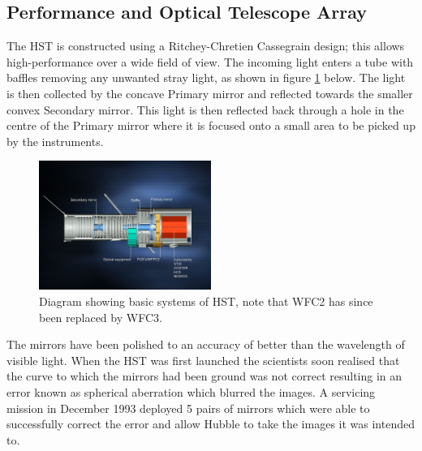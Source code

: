 	\subsection{Performance and Optical Telescope Array} %
		\label{ssub:performance_and_optical_telescope_array}
		The HST is constructed using a Ritchey-Chretien Cassegrain design; this allows high-performance over a wide field of view. The incoming light enters a tube with baffles removing any unwanted stray light, as shown in figure \ref{fig:HST_optical_diagram} below. The light is then collected by the concave Primary mirror and reflected towards the smaller convex Secondary mirror. This light is then reflected back through a hole in the centre of the Primary mirror where it is focused onto a small area to be picked up by the instruments\cite{Hubsite_5}.
		\begin{figure}[ht]
			\centering
			\includegraphics[width=0.5\textwidth]{../Images/HST_optical_diagram.jpg}
			\caption{Diagram showing basic systems of HST, note that WFC2 has since been replaced by WFC3.\label{fig:HST_optical_diagram}}
		\end{figure}

		The mirrors have been polished to an accuracy of better than the wavelength of visible light. When the HST was first launched the scientists soon realised that the curve to which the mirrors had been ground was not correct resulting in an error known as spherical aberration which blurred the images. A servicing mission in December 1993 deployed 5 pairs of mirrors which were able to successfully correct the error and allow Hubble to take the images it was intended to\cite{ESA_1}.

